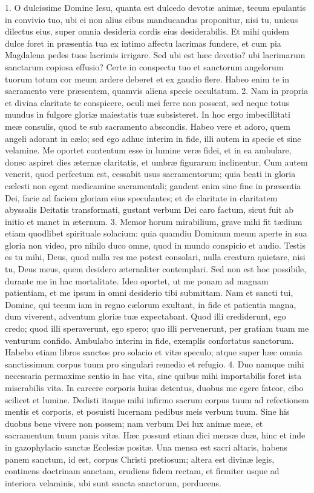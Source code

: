1. O dulcissime Domine Iesu, quanta est dulcedo devotæ animæ, tecum epulantis in convivio tuo, ubi ei non alius cibus manducandus proponitur, nisi tu, unicus dilectus eius, super omnia desideria cordis eius desiderabilis. Et mihi quidem dulce foret in præsentia tua ex intimo affectu lacrimas fundere, et cum pia Magdalena pedes tuos lacrimis irrigare. Sed ubi est hæc devotio? ubi lacrimarum sanctarum copiosa effusio? Certe in conspectu tuo et sanctorum angelorum tuorum totum cor meum ardere deberet et ex gaudio flere. Habeo enim te in sacramento vere præsentem, quamvis aliena specie occultatum.
2. Nam in propria et divina claritate te conspicere, oculi mei ferre non possent, sed neque totus mundus in fulgore gloriæ maiestatis tuæ subsisteret. In hoc ergo imbecillitati meæ consulis, quod te sub sacramento abscondis. Habeo vere et adoro, quem angeli adorant in cælo; sed ego adhuc interim in fide, illi autem in specie et sine velamine. Me oportet contentum esse in lumine veræ fidei, et in ea ambulare, donec aspiret dies æternæ claritatis, et umbræ figurarum inclinentur. Cum autem venerit, quod perfectum est, cessabit usus sacramentorum; quia beati in gloria cælesti non egent medicamine sacramentali; gaudent enim sine fine in præsentia Dei, facie ad faciem gloriam eius speculantes; et de claritate in claritatem abyssalis Deitatis transformati, gustant verbum Dei caro factum, sicut fuit ab initio et manet in æternum.
3. Memor horum mirabilium, grave mihi fit tædium etiam quodlibet spirituale solacium: quia quamdiu Dominum meum aperte in sua gloria non video, pro nihilo duco omne, quod in mundo conspicio et audio. Testis es tu mihi, Deus, quod nulla res me potest consolari, nulla creatura quietare, nisi tu, Deus meus, quem desidero æternaliter contemplari. Sed non est hoc possibile, durante me in hac mortalitate. Ideo oportet, ut me ponam ad magnam patientiam, et me ipsum in omni desiderio tibi submittam. Nam et sancti tui, Domine, qui tecum iam in regno cælorum exultant, in fide et patientia magna, dum viverent, adventum gloriæ tuæ expectabant. Quod illi crediderunt, ego credo; quod illi speraverunt, ego spero; quo illi pervenerunt, per gratiam tuam me venturum confido. Ambulabo interim in fide, exemplis confortatus sanctorum. Habebo etiam libros sanctos pro solacio et vitæ speculo; atque super hæc omnia sanctissimum corpus tuum pro singulari remedio et refugio.
4. Duo namque mihi necessaria permaxime sentio in hac vita, sine quibus mihi importabilis foret ista miserabilis vita. In carcere corporis huius detentus, duobus me egere fateor, cibo scilicet et lumine. Dedisti itaque mihi infirmo sacrum corpus tuum ad refectionem mentis et corporis, et posuisti lucernam pedibus meis verbum tuum. Sine his duobus bene vivere non possem; nam verbum Dei lux animæ meæ, et sacramentum tuum panis vitæ. Hæc possunt etiam dici mensæ duæ, hinc et inde in gazophylacio sanctæ Ecclesiæ positæ. Una mensa est sacri altaris, habens panem sanctum, id est, corpus Christi pretiosum; altera est divinæ legis, continens doctrinam sanctam, erudiens fidem rectam, et firmiter usque ad interiora velaminis, ubi sunt sancta sanctorum, perducens.
